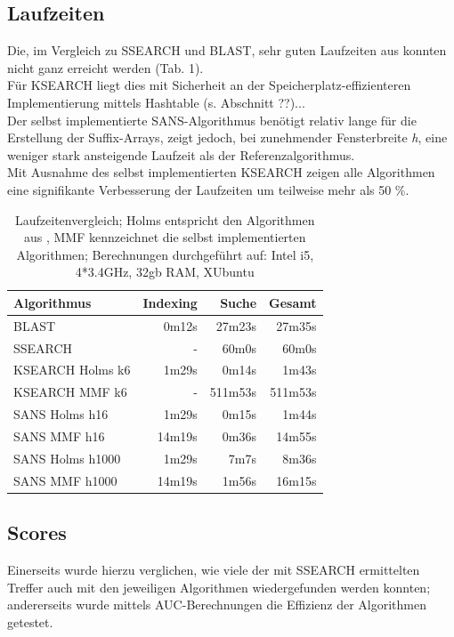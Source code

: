 \documentclass{article}
\begin{document}
\subsection{Laufzeiten}

Die, im Vergleich zu SSEARCH und BLAST, sehr guten Laufzeiten aus \cite{Holm} konnten nicht ganz erreicht werden (Tab. 1).\\Für KSEARCH liegt dies mit Sicherheit an der Speicherplatz-effizienteren Implementierung mittels Hashtable (s. Abschnitt ??)...\\Der selbst implementierte SANS-Algorithmus benötigt relativ lange für die Erstellung der Suffix-Arrays, zeigt jedoch, bei zunehmender Fensterbreite \textit h, eine weniger stark ansteigende Laufzeit als der Referenzalgorithmus.\\Mit Ausnahme des selbst implementierten KSEARCH zeigen alle Algorithmen eine signifikante Verbesserung der Laufzeiten um teilweise mehr als 50 \%.
  \begin{table}[h]
    \caption{Laufzeitenvergleich; Holms entspricht den Algorithmen aus \cite{Holm}, MMF kennzeichnet die selbst implementierten Algorithmen; Berechnungen durchgeführt auf: Intel i5, 4*3.4GHz, 32gb RAM, XUbuntu}
    \begin{center}
    \begin{tabular}{lrrr}
    \hline
    Algorithmus & Indexing & Suche & Gesamt\\
    \hline
    BLAST & 0m12s & 27m23s & 27m35s\\
    SSEARCH & - & 60m0s & 60m0s\\
    KSEARCH Holms k6 & 1m29s & 0m14s & 1m43s\\
    KSEARCH MMF k6 & -  & 511m53s & 511m53s\\
    SANS Holms h16 & 1m29s &  0m15s & 1m44s\\
    SANS MMF  h16 & 14m19s & 0m36s & 14m55s\\
    SANS Holms h1000 & 1m29s & 7m7s & 8m36s\\
    SANS MMF  h1000 & 14m19s & 1m56s & 16m15s\\
    \hline
    \end{tabular}
    \end{center}
  \end{table}

\subsection{Scores}

Einerseits wurde hierzu verglichen, wie viele der mit SSEARCH ermittelten Treffer auch mit den jeweiligen Algorithmen wiedergefunden werden konnten; andererseits wurde mittels AUC-Berechnungen die Effizienz der Algorithmen getestet.
\end{document}
